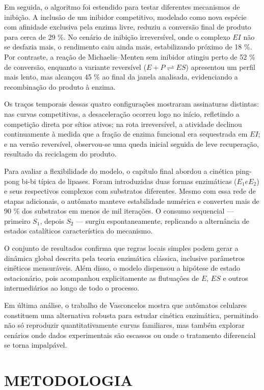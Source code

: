 \documentclass[12pt,oneside]{report}
\begin{document}
Em seguida, o algoritmo foi estendido para testar diferentes mecanismos de inibição. A inclusão de um inibidor competitivo, modelado como nova espécie com afinidade exclusiva pela enzima livre, reduziu a conversão final de produto para cerca de 29 \%. No cenário de inibição irreversível, onde o complexo $EI$ não se desfazia mais, o rendimento caiu ainda mais, estabilizando próximo de 18 \%. Por contraste, a reação de Michaelis–Menten sem inibidor atingiu perto de 52 \% de conversão, enquanto a variante reversível ($E + P \rightleftharpoons ES$) apresentou um perfil mais lento, mas alcançou 45 \% ao final da janela analisada, evidenciando a recombinação do produto à enzima.

Os traços temporais dessas quatro configurações mostraram assinaturas distintas: nas curvas competitivas, a desaceleração ocorreu logo no início, refletindo a competição direta por sítios ativos; na rota irreversível, a atividade declinou continuamente à medida que a fração de enzima funcional era sequestrada em $EI$; e na versão reversível, observou-se uma queda inicial seguida de leve recuperação, resultado da reciclagem do produto.

Para avaliar a flexibilidade do modelo, o capítulo final abordou a cinética ping-pong bi-bi típica de lipases. Foram introduzidas duas formas enzimáticas ($E_1 e E_2$) e seus respectivos complexos com substratos diferentes. Mesmo com essa rede de etapas adicionais, o autômato manteve estabilidade numérica e converteu mais de 90 \% dos substratos em menos de mil iterações. O consumo sequencial — primeiro $S_1$, depois $S_2$ — surgiu espontaneamente, replicando a alternância de estados catalíticos característica do mecanismo.

O conjunto de resultados confirma que regras locais simples podem gerar a dinâmica global descrita pela teoria enzimática clássica, inclusive parâmetros cinéticos mensuráveis. Além disso, o modelo dispensou a hipótese de estado estacionário, pois acompanhou explicitamente as flutuações de $E$, $ES$ e outros intermediários ao longo de todo o processo.

Em última análise, o trabalho de Vasconcelos mostra que autômatos celulares constituem uma alternativa robusta para estudar cinética enzimática, permitindo não só reproduzir quantitativamente curvas familiares, mas também explorar cenários onde dados experimentais são escassos ou onde o tratamento diferencial se torna impalpável.

\chapter{METODOLOGIA}
\end{document}

